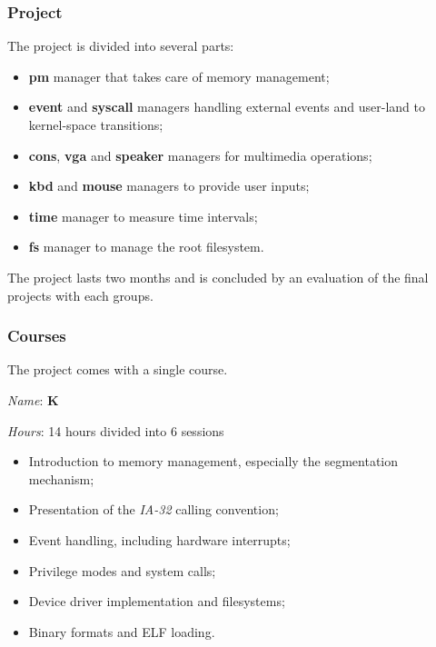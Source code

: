 \begin{multicols}{2}

\subsubsection{Project}

The project is divided into several parts:

\begin{itemize}
  \item
    \textbf{pm} manager that takes care of memory management;
  \item
    \textbf{event} and \textbf{syscall} managers handling external
    events and user-land to kernel-space transitions;
  \item
    \textbf{cons}, \textbf{vga} and \textbf{speaker} managers for
    multimedia operations;
  \item
    \textbf{kbd} and \textbf{mouse} managers to provide user inputs;
  \item
    \textbf{time} manager to measure time intervals;
  \item
    \textbf{fs} manager to manage the root filesystem.
\end{itemize}

The project lasts two months and is concluded by an evaluation of the
final projects with each groups.


\subsubsection{Courses}

The project comes with a single course.


\textit{Name}: \textbf{K}

\textit{Hours}: 14 hours divided into 6 sessions

\begin{itemize}
  \item
    Introduction to memory management, especially the segmentation mechanism;
  \item
    Presentation of the \textit{IA-32} calling convention;
  \item
    Event handling, including hardware interrupts;
  \item
    Privilege modes and system calls;
  \item
    Device driver implementation and filesystems;
  \item
    Binary formats and ELF loading.
\end{itemize}


\end{multicols}
